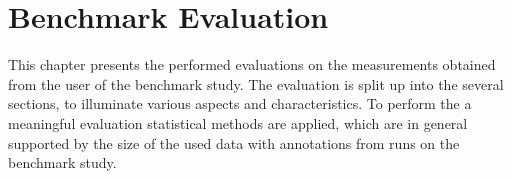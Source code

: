 
\chapter{Benchmark Evaluation}\label{ord:ch5}

This chapter presents the performed evaluations on the measurements obtained from the user of the benchmark study.
The evaluation is split up into the several sections, to illuminate various aspects and characteristics.
To perform the a meaningful evaluation statistical methods are applied, which are in general supported by the size of the used data with \getNumberBenchmarkAnnotations \space annotations from \getNumberBenchmarkRuns runs on the benchmark study.







